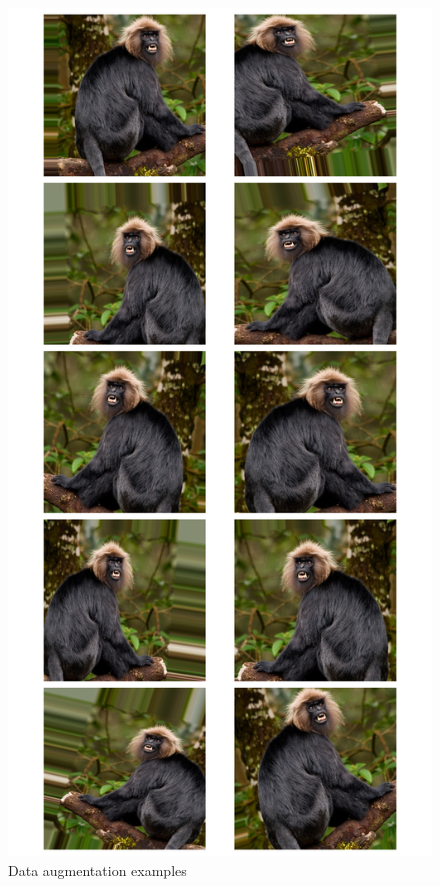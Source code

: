 \begin{figure}[h]
    \centering
    \includegraphics[height=1\linewidth]{../plot/data_augmentation.png}
    \caption{Data augmentation examples}\label{fig:data_augmentation}
\end{figure}